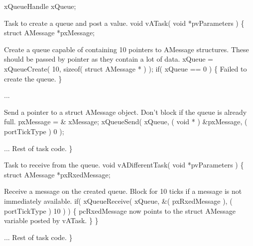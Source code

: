 \begin{DoxyPre} xQueueHandle xQueue;\end{DoxyPre}



\begin{DoxyPre}Task to create a queue and post a value.
 void vATask( void *pvParameters )
 \{
 struct AMessage *pxMessage;\end{DoxyPre}



\begin{DoxyPre}Create a queue capable of containing 10 pointers to AMessage structures.
These should be passed by pointer as they contain a lot of data.
        xQueue = xQueueCreate( 10, sizeof( struct AMessage * ) );
        if( xQueue == 0 )
        \{
Failed to create the queue.
        \}\end{DoxyPre}



\begin{DoxyPre}...\end{DoxyPre}



\begin{DoxyPre}Send a pointer to a struct AMessage object.  Don't block if the
queue is already full.
        pxMessage = \& xMessage;
        xQueueSend( xQueue, ( void * ) \&pxMessage, ( portTickType ) 0 );\end{DoxyPre}



\begin{DoxyPre}... Rest of task code.
 \}\end{DoxyPre}



\begin{DoxyPre}Task to receive from the queue.
 void vADifferentTask( void *pvParameters )
 \{
 struct AMessage *pxRxedMessage;
\begin{DoxyVerb}   if( xQueue != 0 )
   {
\end{DoxyVerb}

Receive a message on the created queue.  Block for 10 ticks if a
message is not immediately available.
                if( xQueueReceive( xQueue, \&( pxRxedMessage ), ( portTickType ) 10 ) )
                \{
pcRxedMessage now points to the struct AMessage variable posted
by vATask.
                \}
        \}\end{DoxyPre}



\begin{DoxyPre}... Rest of task code.
 \}
 \end{DoxyPre}


